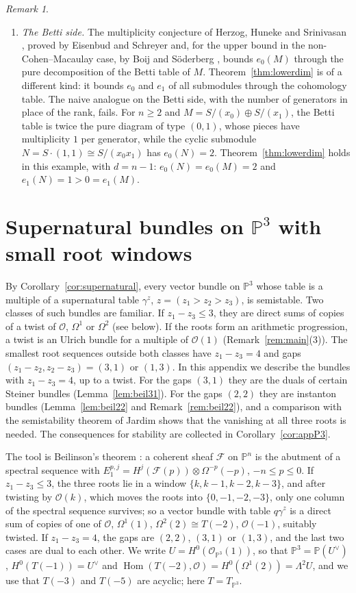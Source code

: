 \documentclass[11pt]{amsart}
\theoremstyle{definition}
\theoremstyle{remark}
\newtheorem{remark}[theorem]{Remark}
\newcommand{\PP}{\mathbb{P}}
\newcommand{\OO}{\mathcal{O}}
\newcommand{\cF}{\mathcal{F}}
\begin{document}
\begin{remark}
\begin{enumerate}[label=(\arabic*)]
\item \emph{The Betti side.} The multiplicity conjecture of Herzog, Huneke and Srinivasan \cite{HS98}, proved by Eisenbud and Schreyer \cite{ES09} and, for the upper bound in the non-Cohen--Macaulay case, by Boij and Söderberg \cite{BS12}, bounds $e_0(M)$ through the pure decomposition of the Betti table of $M$. Theorem~\ref{thm:lowerdim} is of a different kind: it bounds $e_0$ and $e_1$ of all submodules through the cohomology table. The naive analogue on the Betti side, with the number of generators in place of the rank, fails. For $n\ge2$ and $M=S/(x_0)\oplus S/(x_1)$, the Betti table is twice the pure diagram of type $(0,1)$, whose pieces have multiplicity $1$ per generator, while the cyclic submodule $N=S\cdot(1,1)\cong S/(x_0x_1)$ has $e_0(N)=2$. Theorem~\ref{thm:lowerdim} holds in this example, with $d=n-1$: $e_0(N)=e_0(M)=2$ and $e_1(N)=1>0=e_1(M)$.
\end{enumerate}
\end{remark}

\appendix
\section{Supernatural bundles on \texorpdfstring{$\PP^3$}{P3} with small root windows}\label{app:P3}

By Corollary~\ref{cor:supernatural}, every vector bundle on $\PP^3$ whose table is a multiple of a supernatural table $\gamma^z$, $z=(z_1>z_2>z_3)$, is semistable. Two classes of such bundles are familiar. If $z_1-z_3\le3$, they are direct sums of copies of a twist of $\OO$, $\Omega^1$ or $\Omega^2$ (see below). If the roots form an arithmetic progression, a twist is an Ulrich bundle for a multiple of $\OO(1)$ (Remark~\ref{rem:main}(3)). The smallest root sequences outside both classes have $z_1-z_3=4$ and gaps $(z_1-z_2,z_2-z_3)=(3,1)$ or $(1,3)$. In this appendix we describe the bundles with $z_1-z_3=4$, up to a twist. For the gaps $(3,1)$ they are the duals of certain Steiner bundles (Lemma~\ref{lem:beil31}). For the gaps $(2,2)$ they are instanton bundles (Lemma~\ref{lem:beil22} and Remark~\ref{rem:beil22}), and a comparison with the semistability theorem of Jardim \cite{Ja06} shows that the vanishing at all three roots is needed. The consequences for stability are collected in Corollary~\ref{cor:appP3}.

The tool is Beilinson's theorem \cite{Be78}: a coherent sheaf $\cF$ on $\PP^n$ is the abutment of a spectral sequence with $E_1^{p,j}=H^j(\cF(p))\otimes\Omega^{-p}(-p)$, $-n\le p\le0$. If $z_1-z_3\le3$, the three roots lie in a window $\{k,k-1,k-2,k-3\}$, and after twisting by $\OO(k)$, which moves the roots into $\{0,-1,-2,-3\}$, only one column of the spectral sequence survives; so a vector bundle with table $q\gamma^z$ is a direct sum of copies of one of $\OO$, $\Omega^1(1)$, $\Omega^2(2)\cong T(-2)$, $\OO(-1)$, suitably twisted. If $z_1-z_3=4$, the gaps are $(2,2)$, $(3,1)$ or $(1,3)$, and the last two cases are dual to each other. We write $U=H^0(\OO_{\PP^3}(1))$, so that $\PP^3=\PP(U^\vee)$, $H^0(T(-1))=U^\vee$ and $\operatorname{Hom}(T(-2),\OO)=H^0(\Omega^1(2))=\Lambda^2U$, and we use that $T(-3)$ and $T(-5)$ are acyclic; here $T=T_{\PP^3}$.
\end{document}
